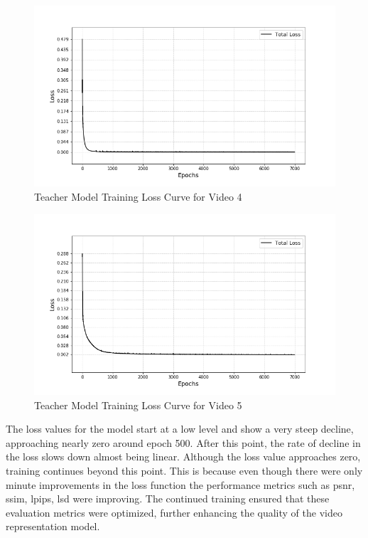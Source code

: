 \documentclass{ioereport}
\begin{document}
\begin{figure}[H]
    \centering
    \includegraphics[height=0.6\linewidth]{assets/audio_video_loss_curves/video1_loss.png}
    \caption{Teacher Model Training Loss Curve for Video 4}
    \label{fig:video-loss-curve-4}
\end{figure}

\begin{figure}[H]
    \centering
    \includegraphics[height=0.6\linewidth]{assets/audio_video_loss_curves/video5_loss.png}
    \caption{Teacher Model Training Loss Curve for Video 5}
    \label{fig:video-loss-curve-5}
\end{figure}


The loss values for the model start at a low level and show a very steep decline, approaching nearly zero around epoch 500. After this point, the rate of decline in the loss slows down almost being linear. Although the loss value approaches zero, training continues beyond this point. This is because even though there were only minute improvements in the loss function the performance metrics such as \gls{psnr}, \gls{ssim}, \gls{lpips}, \gls{lsd} were improving. The continued training ensured that these evaluation metrics were optimized, further enhancing the quality of the video representation model.
\end{document}
